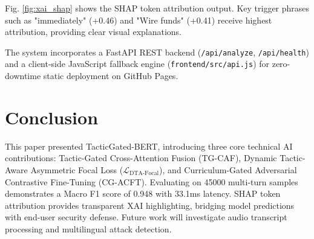 \documentclass[10pt,conference]{IEEEtran}
\begin{document}
Fig. \ref{fig:xai_shap} shows the SHAP token attribution output. Key trigger phrases such as "immediately" (+0.46) and "Wire funds" (+0.41) receive highest attribution, providing clear visual explanations.

The system incorporates a FastAPI REST backend (\texttt{/api/analyze}, \texttt{/api/health}) and a client-side JavaScript fallback engine (\texttt{frontend/src/api.js}) for zero-downtime static deployment on GitHub Pages.

\section{Conclusion}
This paper presented TacticGated-BERT, introducing three core technical AI contributions: Tactic-Gated Cross-Attention Fusion (TG-CAF), Dynamic Tactic-Aware Asymmetric Focal Loss ($\mathcal{L}_{\text{DTA-Focal}}$), and Curriculum-Gated Adversarial Contrastive Fine-Tuning (CG-ACFT). Evaluating on 45000 multi-turn samples demonstrates a Macro F1 score of 0.948 with 33.1ms latency. SHAP token attribution provides transparent XAI highlighting, bridging model predictions with end-user security defense. Future work will investigate audio transcript processing and multilingual attack detection.



\end{document}
